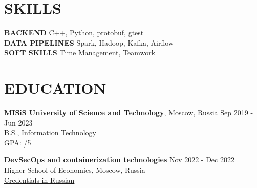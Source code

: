 \documentclass{resume} %
\begin{document}
\begin{multicols}{2}
    \begin{minipage}{\linewidth}
        \section*{SKILLS}
        {\bf BACKEND} \hfill C++, Python, protobuf, gtest \\
        {\bf DATA PIPELINES} \hfill Spark, Hadoop, Kafka, Airflow \\
        {\bf SOFT SKILLS} \hfill Time Management, Teamwork \\
    \end{minipage}

    \begin{minipage}{\linewidth}
        \section*{EDUCATION}
        {\bf MISiS University of Science and Technology}, Moscow, Russia \hfill {Sep 2019 - Jun 2023}\\
        B.S., Information Technology\\
        GPA: /5\\
    \end{minipage}
\end{multicols}

{\bf DevSecOps and containerization technologies} \hfill {Nov 2022 - Dec 2022} \\
Higher School of Economics, Moscow, Russia \\
\href{https://drive.google.com/file/d/11NyGWnh3GeXqrwNIw-2x_bBE39JUaymN}{Credentials in Russian}

\end{document}
